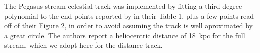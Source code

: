 The Pegasus stream celestial track was implemented by fitting a third degree polynomial to the end points reported 
by \citet{Perottoni2019} in their Table 1, plus a few points read-off of their Figure 2, in order to avoid assuming the track is well aproximated by a great circle. The authors report a heliocentric distance of 18~kpc for the full stream, which we adopt here for the distance track. 
